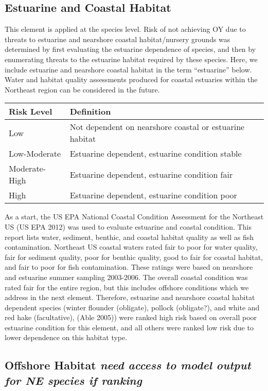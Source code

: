 \documentclass[11pt,]{article}
\begin{document}
\subsection{Estuarine and Coastal
Habitat}\label{estuarine-and-coastal-habitat}

This element is applied at the species level. Risk of not achieving OY
due to threats to estuarine and nearshore coastal habitat/nursery
grounds was determined by first evaluating the estuarine dependence of
species, and then by enumerating threats to the estuarine habitat
required by these species. Here, we include estuarine and nearshore
coastal habitat in the term ``estuarine'' below. Water and habitat
quality assessments produced for coastal estuaries within the Northeast
region can be considered in the future.

\begin{longtable}[]{@{}ll@{}}
\toprule
Risk Level & Definition\tabularnewline
\midrule
\endhead
Low & Not dependent on nearshore coastal or estuarine
habitat\tabularnewline
Low-Moderate & Estuarine dependent, estuarine condition
stable\tabularnewline
Moderate-High & Estuarine dependent, estuarine condition
fair\tabularnewline
High & Estuarine dependent, estuarine condition poor\tabularnewline
\bottomrule
\end{longtable}

As a start, the US EPA National Coastal Condition Assessment for the
Northeast US (US EPA 2012) was used to evaluate estuarine and coastal
condition. This report lists water, sediment, benthic, and coastal
habitat quality as well as fish contamination. Northeast US coastal
waters rated fair to poor for water quality, fair for sediment quality,
poor for benthic quality, good to fair for coastal habitat, and fair to
poor for fish contamination. These ratings were based on nearshore and
estuarine summer sampling 2003-2006. The overall coastal condition was
rated fair for the entire region, but this includes offshore conditions
which we address in the next element. Therefore, estuarine and nearshore
coastal habitat dependent species (winter flounder (obligate), pollock
(obligate?), and white and red hake (facultative), (Able 2005)) were
ranked high risk based on overall poor estuarine condition for this
element, and all others were ranked low risk due to lower dependence on
this habitat type.

\subsection{\texorpdfstring{Offshore Habitat \emph{need access to model
output for NE species if
ranking}}{Offshore Habitat need access to model output for NE species if ranking}}\label{offshore-habitat-need-access-to-model-output-for-ne-species-if-ranking}
\end{document}
